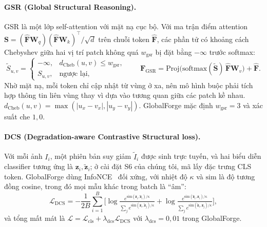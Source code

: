 \documentclass[11pt,a4paper]{article}
\begin{document}
\paragraph{GSR (Global Structural Reasoning).} GSR là một lớp self-attention với mặt nạ cục bộ. Với ma trận điểm attention $\mathbf{S}=(\hat{\mathbf{F}}\mathbf{W}_q)(\hat{\mathbf{F}}\mathbf{W}_k)^{\top}/\sqrt{d}$ trên chuỗi token $\hat{\mathbf{F}}$, các phần tử có khoảng cách Chebyshev giữa hai vị trí patch không quá $w_{\text{gsr}}$ bị đặt bằng $-\infty$ trước softmax:
\begin{equation}
\tilde{S}_{u,v}=\begin{cases}-\infty,& d_{\text{Cheb}}(u,v)\le w_{\text{gsr}},\\ S_{u,v},&\text{ngược lại,}\end{cases}\qquad
\mathbf{F}_{\text{GSR}}=\text{Proj}\big(\text{softmax}(\tilde{\mathbf{S}})\,\hat{\mathbf{F}}\mathbf{W}_v\big)+\hat{\mathbf{F}}.
\end{equation}
Nhờ mặt nạ, mỗi token chỉ cập nhật từ vùng ở xa, nên mô hình buộc phải tích hợp thông tin liên vùng thay vì dựa vào tương quan giữa các patch kề nhau. $d_{\text{Cheb}}(u,v)=\max(|u_x-v_x|,|u_y-v_y|)$. GlobalForge mặc định $w_{\text{gsr}}=3$ và xác suất che $1{,}0$.

\paragraph{DCS (Degradation-aware Contrastive Structural loss).} Với mỗi ảnh $I_i$, một phiên bản suy giảm $\tilde I_i$ được sinh trực tuyến, và hai biểu diễn classifier tương ứng là $\mathbf{z}_i,\tilde{\mathbf{z}}_i$; ở cài đặt S6 của chúng tôi, mã lấy đặc trưng CLS token. GlobalForge dùng InfoNCE~\cite{oord2018representation} đối xứng, với nhiệt độ $\kappa$ và $\mathrm{sim}$ là độ tương đồng cosine, trong đó mọi mẫu khác trong batch là ``âm'':
\begin{equation}
\mathcal{L}_{\text{DCS}}=-\frac{1}{2B}\sum_{i=1}^{B}\Big[\log\tfrac{e^{\mathrm{sim}(\mathbf{z}_i,\tilde{\mathbf{z}}_i)/\kappa}}{\sum_j e^{\mathrm{sim}(\mathbf{z}_i,\tilde{\mathbf{z}}_j)/\kappa}}+\log\tfrac{e^{\mathrm{sim}(\tilde{\mathbf{z}}_i,\mathbf{z}_i)/\kappa}}{\sum_j e^{\mathrm{sim}(\tilde{\mathbf{z}}_i,\mathbf{z}_j)/\kappa}}\Big],
\end{equation}
và tổng mất mát là $\mathcal{L}=\mathcal{L}_{\text{cls}}+\lambda_{\text{dcs}}\mathcal{L}_{\text{DCS}}$ với $\lambda_{\text{dcs}}=0{,}01$ trong GlobalForge.
\end{document}
